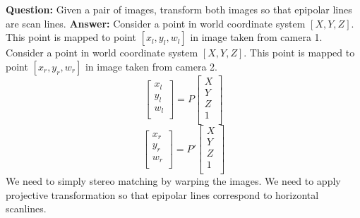 \documentclass{exam}[14pt]
\begin{document}
\begin{center}
\end{center}
\vspace{5mm}
\textbf{Question:}\newline\newline
\question Given a pair of images, transform both images so that epipolar lines are scan lines.
\newline \newline
\textbf{Answer:}\newline\newline
Consider a point in  world coordinate system $[X,Y,Z]$. This point is mapped to point $[x_l,y_l,w_l]$ in \newline image  taken from camera 1. 
\newline\newline
Consider a point in  world coordinate system $[X,Y,Z]$. This point is mapped to point $[x_r,y_r,w_r]$ in \newline image  taken from camera 2.
\newline 
\[
\begin{bmatrix}
    x_l\\
    y_l\\ 
    w_l\\
\end{bmatrix}
=  P 
\begin{bmatrix}
    X\\
    Y\\ 
    Z\\
    1\\
\end{bmatrix} 
\]
\newline 
\[
\begin{bmatrix}
    x_r\\
    y_r\\ 
    w_r\\
\end{bmatrix}
=  P'
\begin{bmatrix}
    X\\
    Y\\ 
    Z\\
    1\\
\end{bmatrix} 
\]
We need to simply stereo matching by warping the images. \newline\newline
We need to apply projective transformation so that epipolar lines correspond to horizontal scanlines.
\end{document}
